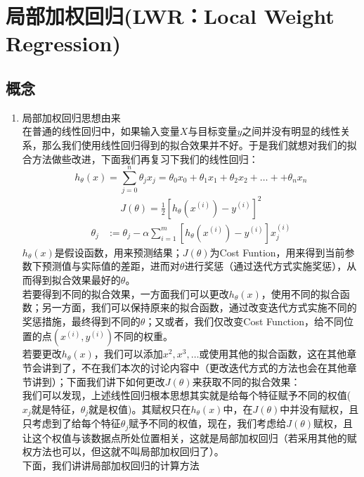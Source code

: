 \section{局部加权回归(LWR：Local Weight Regression)}
\subsection{概念}
\begin{enumerate}
	\item 局部加权回归思想由来 \\
	在普通的线性回归中，如果输入变量$X$与目标变量$y$之间并没有明显的线性关系，那么我们使用线性回归得到的拟合效果并不好。于是我们就想对我们的拟合方法做些改进，下面我们再复习下我们的线性回归：
	\begin{equation}
		h_{\theta}(x) = \sum_{j=0}^n \theta_jx_j = \theta_0x_0 + \theta_1x_1 + \theta_2x_2 + \dots +  + \theta_nx_n
	\end{equation}
	\begin{equation}\begin{aligned}
		J(\theta) = \frac{1}{2} \left[h_{\theta} {(x^{(i)})} - y^{(i)}\right]^2
	\end{aligned}\end{equation}
	\begin{equation}\begin{aligned}
		\theta_j &:= \theta_j - \alpha \sum_{i=1}^m \left[ h_\theta(x^{(i)}) - y^{(i)} \right]x_j^{(i)}
	\end{aligned}\end{equation}
	$h_\theta(x)$是假设函数，用来预测结果；$J(\theta)$为Cost Funtion，用来得到当前参数下预测值与实际值的差距，进而对$\theta$进行奖惩（通过迭代方式实施奖惩），从而得到拟合效果最好的$\theta$。\\
	若要得到不同的拟合效果，一方面我们可以更改$h_\theta(x)$，使用不同的拟合函数；另一方面，我们可以保持原来的拟合函数，通过改变迭代方式实施不同的奖惩措施，最终得到不同的$\theta$；又或者，我们仅改变Cost Function，给不同位置的点$(x^{(i)}, y^{(i)})$不同的权重。\\
	若要更改$h_\theta(x)$，我们可以添加$x^2, x^3, \dots$或使用其他的拟合函数，这在其他章节会讲到了，不在我们本次的讨论内容中（更改迭代方式的方法也会在其他章节讲到）；下面我们讲下如何更改$J(\theta)$来获取不同的拟合效果：\\
	我们可以发现，上述线性回归根本思想其实就是给每个特征赋予不同的权值($x_j$就是特征，$\theta_j$就是权值)。其赋权只在$h_\theta(x)$中，在$J(\theta)$中并没有赋权，且只考虑到了给每个特征$\theta_j$赋予不同的权值，现在，我们考虑给$J(\theta)$赋权，且让这个权值与该数据点所处位置相关，这就是局部加权回归（若采用其他的赋权方法也可以，但这就不叫局部加权回归了）。\\
	下面，我们讲讲局部加权回归的计算方法
\end{enumerate}

